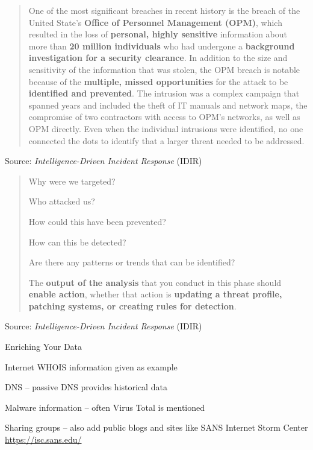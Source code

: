\documentclass[Screen16to9,17pt]{foils}
\begin{document}
\begin{quote}
One of the most significant breaches in recent history is the breach of the United State’s {\bf Office of Personnel Management (OPM)}, which resulted in the loss of {\bf personal, highly sensitive} information about more than {\bf 20 million individuals} who had undergone a {\bf background investigation for a security clearance}. In addition to the size and sensitivity of the information that was stolen, the OPM breach is notable because
of the {\bf multiple, missed opportunities} for the attack to be {\bf identified and prevented}. The intrusion was a complex campaign that spanned years and included the theft of IT manuals and network maps, the compromise of two contractors with access to OPM’s networks, as well as OPM directly. Even when the individual intrusions were identified, no one connected the dots to identify that a larger threat needed to be addressed.
\end{quote}
Source: \emph{Intelligence-Driven Incident Response} (IDIR)




\begin{quote}

\begin{list2}
\item Why were we targeted?
\item Who attacked us?
\item How could this have been prevented?
\item How can this be detected?
\item Are there any patterns or trends that can be identified?
\end{list2}

The {\bf output of the analysis} that you conduct in this phase should {\bf enable action},
whether that action is {\bf updating a threat profile, patching systems, or creating rules for detection}.
\end{quote}
Source: \emph{Intelligence-Driven Incident Response} (IDIR)




\begin{quote}

\end{quote}

Enriching Your Data
\begin{list2}
\item Internet WHOIS information given as example
\item DNS -- passive DNS provides historical data
\item Malware information -- often Virus Total is mentioned
\item Sharing groups -- also add public blogs and sites like SANS Internet Storm Center\\
\url{https://isc.sans.edu/}
\end{list2}
\end{document}

